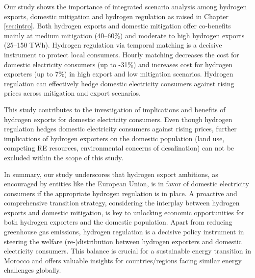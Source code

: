 



Our study shows the importance of integrated scenario analysis among hydrogen exports, domestic mitigation and hydrogen regulation as raised in Chapter \ref{sec:intro}.
Both hydrogen exports and domestic mitigation offer co-benefits mainly at medium mitigation (40--60\%) and moderate to high hydrogen exports (25--150 TWh). Hydrogen regulation via temporal matching is a decisive instrument
to protect local consumers. Hourly matching decreases the cost for domestic electricity consumers (up to -31\%) and increases cost for hydrogen exporters (up to 7\%) in high export and low mitigation scenarios. Hydrogen regulation can effectively hedge domestic electricity consumers against rising prices across mitigation and export scenarios. %

This study contributes to the investigation of 
implications and benefits of hydrogen exports for domestic electricity consumers. Even though hydrogen regulation hedges domestic electricity consumers against rising prices, further implications of hydrogen exporters on the domestic population (land use, competing RE resources, environmental concerns of desalination) can not be excluded within the scope of this study.

In summary, our study underscores that hydrogen export ambitions, as encouraged by entities like the European Union, is in favor of domestic electricity consumers 
if the appropriate hydrogen regulation is in place. A proactive and comprehensive transition strategy, considering the interplay between hydrogen exports and domestic mitigation, is key to unlocking economic opportunities for both hydrogen exporters and the domestic population. 
Apart from reducing greenhouse gas emissions, hydrogen regulation is a decisive policy instrument in steering the welfare (re-)distribution between hydrogen exporters and domestic electricity consumers. 
This balance is crucial for a sustainable energy transition in Morocco and offers valuable insights for countries/regions facing similar energy challenges globally.



